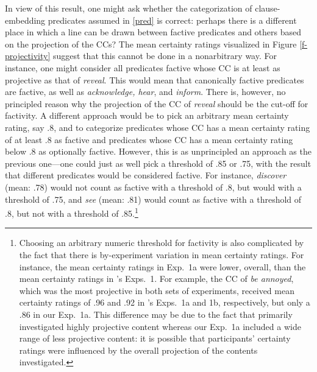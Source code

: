 \documentclass{language}
\newcommand{\6}{\mbox{$[\hspace*{-.6mm}[$}}
\newcommand{\9}{\mbox{$]\hspace*{-.6mm}]$}}
\newcommand{\citepos}[1]{\citeauthor{#1}'s \citeyear{#1}}
\begin{document}
In view of this result, one might ask whether the categorization of clause-embedding predicates assumed in \ref{pred} is correct: perhaps there is a different place in which a line can be drawn between factive predicates and others based on the projection of the CCs? The mean certainty ratings visualized in Figure \ref{f-projectivity} suggest that this cannot be done in a nonarbitrary way. For instance, one might consider all predicates factive whose CC is at least as projective as that of {\em reveal}. This would mean that canonically factive predicates are factive, as well as {\em acknowledge, hear}, and {\em inform}. There is, however, no principled reason why the projection of the CC of {\em reveal} should be the cut-off for factivity. A different approach would be to pick an arbitrary mean certainty rating, say .8, and to categorize predicates whose CC has a mean certainty rating of at least .8 as factive and predicates whose CC has a mean certainty rating below .8 as optionally factive. However, this is as unprincipled an approach as the previous one---one could just as well pick a threshold of .85 or .75, with the result that different predicates would be considered factive. For instance, {\em discover} (mean: .78) would not count as factive with a threshold of .8, but would with a threshold of .75, and {\em see} (mean: .81) would count as factive with a threshold of .8, but not with a threshold of .85.\footnote{Choosing an arbitrary numeric threshold for factivity is also complicated by the fact that there is by-experiment variation in mean certainty ratings. For instance, the mean certainty ratings in Exp.~1a were lower, overall, than the mean certainty ratings in \citepos{tbd-variability} Exps.~1. For example, the CC of {\em be annoyed}, which was the most projective in both sets of experiments, received mean certainty ratings of .96  and .92 in \citepos{tbd-variability} Exps.~1a and 1b, respectively, but only a .86 in our Exp.~1a. This difference may be due to the fact that \citet{tbd-variability} primarily investigated highly projective content whereas our Exp.~1a included a wide range of less projective content: it is possible that participants' certainty ratings were influenced by the overall projection of the contents investigated.}
\end{document}
